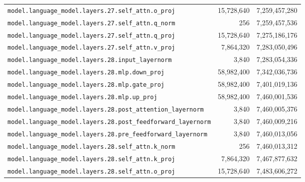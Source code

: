 \documentclass[10pt,a4paper]{article}
\theoremstyle{definition}
\begin{document}
\begin{appendices}
\begin{longtable}{p{9.5cm}rr}
\texttt{model.\allowbreak{}language\_model.\allowbreak{}layers.\allowbreak{}27.\allowbreak{}self\_attn.\allowbreak{}o\_proj} & 15,728,640 & 7,259,457,280 \\
\texttt{model.\allowbreak{}language\_model.\allowbreak{}layers.\allowbreak{}27.\allowbreak{}self\_attn.\allowbreak{}q\_norm} & 256 & 7,259,457,536 \\
\texttt{model.\allowbreak{}language\_model.\allowbreak{}layers.\allowbreak{}27.\allowbreak{}self\_attn.\allowbreak{}q\_proj} & 15,728,640 & 7,275,186,176 \\
\texttt{model.\allowbreak{}language\_model.\allowbreak{}layers.\allowbreak{}27.\allowbreak{}self\_attn.\allowbreak{}v\_proj} & 7,864,320 & 7,283,050,496 \\
\texttt{model.\allowbreak{}language\_model.\allowbreak{}layers.\allowbreak{}28.\allowbreak{}input\_layernorm} & 3,840 & 7,283,054,336 \\
\texttt{model.\allowbreak{}language\_model.\allowbreak{}layers.\allowbreak{}28.\allowbreak{}mlp.\allowbreak{}down\_proj} & 58,982,400 & 7,342,036,736 \\
\texttt{model.\allowbreak{}language\_model.\allowbreak{}layers.\allowbreak{}28.\allowbreak{}mlp.\allowbreak{}gate\_proj} & 58,982,400 & 7,401,019,136 \\
\texttt{model.\allowbreak{}language\_model.\allowbreak{}layers.\allowbreak{}28.\allowbreak{}mlp.\allowbreak{}up\_proj} & 58,982,400 & 7,460,001,536 \\
\texttt{model.\allowbreak{}language\_model.\allowbreak{}layers.\allowbreak{}28.\allowbreak{}post\_attention\_layernorm} & 3,840 & 7,460,005,376 \\
\texttt{model.\allowbreak{}language\_model.\allowbreak{}layers.\allowbreak{}28.\allowbreak{}post\_feedforward\_layernorm} & 3,840 & 7,460,009,216 \\
\texttt{model.\allowbreak{}language\_model.\allowbreak{}layers.\allowbreak{}28.\allowbreak{}pre\_feedforward\_layernorm} & 3,840 & 7,460,013,056 \\
\texttt{model.\allowbreak{}language\_model.\allowbreak{}layers.\allowbreak{}28.\allowbreak{}self\_attn.\allowbreak{}k\_norm} & 256 & 7,460,013,312 \\
\texttt{model.\allowbreak{}language\_model.\allowbreak{}layers.\allowbreak{}28.\allowbreak{}self\_attn.\allowbreak{}k\_proj} & 7,864,320 & 7,467,877,632 \\
\texttt{model.\allowbreak{}language\_model.\allowbreak{}layers.\allowbreak{}28.\allowbreak{}self\_attn.\allowbreak{}o\_proj} & 15,728,640 & 7,483,606,272 \\

\end{longtable}
\end{appendices}
\end{document}
